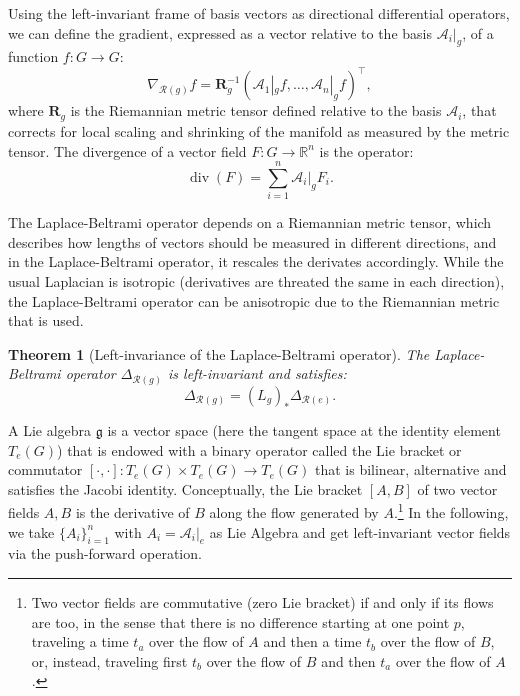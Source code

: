 \documentclass{article}
\newtheorem{theorem}{Theorem}[section]
\DeclareMathOperator{\dive}{div}
\begin{document}
Using the left-invariant frame of basis vectors as directional differential operators, we can define the gradient, expressed as a vector relative to the basis $\mathcal{A}_i|_g$, of a function $f : G \to G$:
\begin{equation}
\nabla_{\mathcal{R}(g)} f = \mathbf{R}_{g}^{-1} (\mathcal{A}_1|_g f, \dots, \mathcal{A}_n|_g f)^\top,
\end{equation}
where $\mathbf{R}_{g}$ is the Riemannian metric tensor defined relative to the basis $\mathcal{A}_i$, that corrects for local scaling and shrinking of the manifold as measured by the metric tensor.
The divergence of a vector field $F : G \to \mathbb{R}^n$ is the operator:
\begin{equation}
\dive(F) = \sum_{i=1}^n \mathcal{A}_i|_g F_i.
\end{equation}

The Laplace-Beltrami operator depends on a Riemannian metric tensor, which describes how lengths of vectors should be measured in different directions, and in the Laplace-Beltrami operator, it rescales the derivates accordingly. While the usual Laplacian is isotropic (derivatives are threated the same in each direction), the Laplace-Beltrami operator can be anisotropic due to the Riemannian metric that is used.

\begin{theorem}[Left-invariance of the Laplace-Beltrami operator] \label{thm:equiv_laplace_beltrami}
The Laplace-Beltrami operator $\Delta_{\mathcal{R}(g)}$ is left-invariant and satisfies:
\begin{equation}
\Delta_{\mathcal{R}(g)} = (L_g)_* \Delta_{\mathcal{R}(e)}.
\end{equation}
\end{theorem}


A Lie algebra $\mathfrak{g}$ is a vector space (here the tangent space at the identity element $T_e(G)$) that is endowed with a binary operator called the Lie bracket or commutator $[\cdot, \cdot] : T_e(G) \times T_e(G) \to T_e(G)$ that is bilinear, alternative and satisfies the Jacobi identity. Conceptually, the Lie bracket $[A, B]$ of two vector fields $A, B$ is the derivative of $B$ along the flow generated by $A$.\footnote{Two vector fields are commutative (zero Lie bracket) if and only if its flows are too, in the sense that there is no difference starting at one point $p$, traveling a time $t_a$ over the flow of $A$ and then a time $t_b$ over the flow of $B$, or, instead, traveling first $t_b$ over the flow of $B$ and then $t_a$ over the flow of $A$.} In the following, we take $\{A_i\}_{i=1}^n$ with $A_i = \mathcal{A}_i|_e$ as Lie Algebra and get left-invariant vector fields via the push-forward operation.
\end{document}
